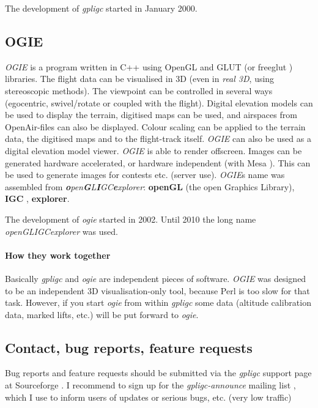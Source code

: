The development of \emph{gpligc} started in January 2000.


\subsection{OGIE}
\emph{OGIE} is a  program written in C++ using OpenGL and GLUT (or freeglut \cite{freeglut}) libraries.
The flight data can be visualised in 3D (even in \emph{real 3D}, using stereoscopic methods).
The viewpoint can be controlled in several  ways (egocentric, swivel/rotate or coupled with the flight).
Digital elevation models can be used to display the terrain, digitised maps can be used, and airspaces from OpenAir\texttrademark-files can also be displayed.
Colour scaling can be applied to the terrain data, the digitised maps and to the flight-track itself.
\emph{OGIE} can also be used as a digital elevation model viewer.
\emph{OGIE} is able to render offscreen. Images can be generated hardware accelerated, or hardware independent (with Mesa \cite{mesa}). This can be used to generate images for contests etc. (server use).
\emph{OGIE}s name was assembled from \emph{\textbf{o}pen\textbf{G}L\textbf{I}GC\textbf{e}xplorer}: \textbf{openGL} (the open Graphics Library), \textbf{IGC} \cite{igc}, \textbf{explorer}.


The development of \emph{ogie} started in 2002. Until 2010 the long name \emph{openGLIGCexplorer} was used.


\paragraph{How they work together}
Basically \emph{gpligc} and \emph{ogie} are independent pieces of software.
\emph{OGIE} was designed to be an independent 3D visualisation-only tool, because Perl is too slow for that task.
However, if you start \emph{ogie} from within \emph{gpligc} some data (altitude calibration data, marked lifts, etc.) will be put forward to \emph{ogie}.

\subsection{Contact, bug reports, feature requests}
Bug reports and feature requests should be submitted via the \emph{gpligc} support page at Sourceforge \cite{gpligc}.
I recommend to sign up for the \emph{gpligc-announce} mailing list \cite{gpligc}, which I use to inform users of updates or serious bugs, etc. (very low traffic)




